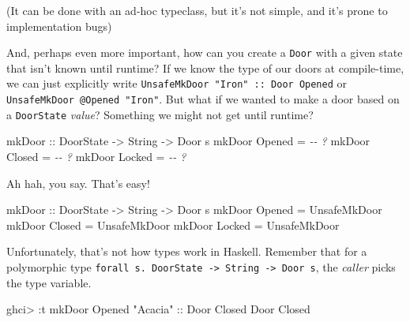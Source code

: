 \documentclass[]{article}
\newenvironment{Shaded}{}{}
\newcommand{\CommentTok}[1]{\textcolor[rgb]{0.38,0.63,0.69}{\textit{#1}}}
\newcommand{\DataTypeTok}[1]{\textcolor[rgb]{0.56,0.13,0.00}{#1}}
\newcommand{\NormalTok}[1]{#1}
\newcommand{\OperatorTok}[1]{\textcolor[rgb]{0.40,0.40,0.40}{#1}}
\newcommand{\OtherTok}[1]{\textcolor[rgb]{0.00,0.44,0.13}{#1}}
\newcommand{\StringTok}[1]{\textcolor[rgb]{0.25,0.44,0.63}{#1}}
\begin{document}
(It can be done with an ad-hoc typeclass, but it's not simple, and it's prone to
implementation bugs)

And, perhaps even more important, how can you create a \texttt{Door} with a
given state that isn't known until runtime? If we know the type of our doors at
compile-time, we can just explicitly write
\texttt{UnsafeMkDoor\ "Iron"\ ::\ Door\ \textquotesingle{}Opened} or
\texttt{UnsafeMkDoor\ @\textquotesingle{}Opened\ "Iron"}. But what if we wanted
to make a door based on a \texttt{DoorState} \emph{value}? Something we might
not get until runtime?

\begin{Shaded}
\begin{Highlighting}[]
\OtherTok{mkDoor ::} \DataTypeTok{DoorState} \OtherTok{{-}>} \DataTypeTok{String} \OtherTok{{-}>} \DataTypeTok{Door}\NormalTok{ s}
\NormalTok{mkDoor }\DataTypeTok{Opened} \OtherTok{=} \CommentTok{{-}{-} ?}
\NormalTok{mkDoor }\DataTypeTok{Closed} \OtherTok{=} \CommentTok{{-}{-} ?}
\NormalTok{mkDoor }\DataTypeTok{Locked} \OtherTok{=} \CommentTok{{-}{-} ?}
\end{Highlighting}
\end{Shaded}

Ah hah, you say. That's easy!

\begin{Shaded}
\begin{Highlighting}[]
\OtherTok{mkDoor ::} \DataTypeTok{DoorState} \OtherTok{{-}>} \DataTypeTok{String} \OtherTok{{-}>} \DataTypeTok{Door}\NormalTok{ s}
\NormalTok{mkDoor }\DataTypeTok{Opened} \OtherTok{=} \DataTypeTok{UnsafeMkDoor}
\NormalTok{mkDoor }\DataTypeTok{Closed} \OtherTok{=} \DataTypeTok{UnsafeMkDoor}
\NormalTok{mkDoor }\DataTypeTok{Locked} \OtherTok{=} \DataTypeTok{UnsafeMkDoor}
\end{Highlighting}
\end{Shaded}

Unfortunately, that's not how types work in Haskell. Remember that for a
polymorphic type
\texttt{forall\ s.\ DoorState\ -\textgreater{}\ String\ -\textgreater{}\ Door\ s},
the \emph{caller} picks the type variable.

\begin{Shaded}
\begin{Highlighting}[]
\NormalTok{ghci}\OperatorTok{>} \OperatorTok{:}\NormalTok{t mkDoor }\DataTypeTok{Opened} \StringTok{"Acacia"}\OtherTok{ ::} \DataTypeTok{Door} \DataTypeTok{\textquotesingle{}Closed}
\DataTypeTok{Door} \DataTypeTok{\textquotesingle{}Closed}
\end{Highlighting}
\end{Shaded}
\end{document}
